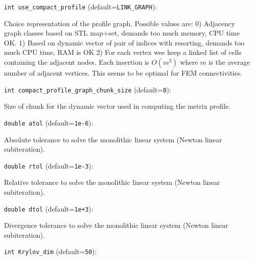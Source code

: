 \item\verb+int use_compact_profile+ {\rm(default=\verb|LINK_GRAPH|)}:

Choice representation of the profile graph. Possible values are:
0) Adjacency graph classes
based on STL map+set, demands too much memory, CPU time OK.
1) Based on dynamic vector of pair of indices with resorting,
demands too much CPU time, RAM is OK
2) For each vertex wee keep a linked list of cells containing the
adjacent nodes. Each insertion is $O(m^2)$ where $m$ is the average
number of adjacent vertices. This seems to be optimal for
FEM connectivities.

\item\verb+int compact_profile_graph_chunk_size+ {\rm(default=\verb|0|)}:

Size of chunk for the dynamic vector used in computing the
mstrix profile. 

\item\verb+double atol+ {\rm(default=\verb|1e-6|)}:

Absolute tolerance to solve the monolithic linear
system (Newton linear subiteration).

\item\verb+double rtol+ {\rm(default=\verb|1e-3|)}:

Relative tolerance to solve the monolithic linear
system (Newton linear subiteration).

\item\verb+double dtol+ {\rm(default=\verb|1e+3|)}:

Divergence tolerance to solve the monolithic linear
system (Newton linear subiteration).

\item\verb+int Krylov_dim+ {\rm(default=\verb|50|)}:

